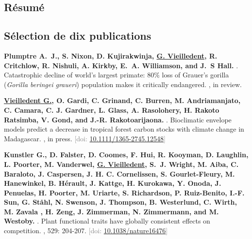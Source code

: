 \documentclass[10pt,a4paper,sans]{moderncv}
\newcounter{enumiv_gv}
\begin{document}
\vspace{0.3cm}
\subsection{Résumé}


\vspace{0.3cm}
\subsection{Sélection de dix publications}

\begin{thebibliography}{10}

\setcounter{enumiv}{9}
\textbf{Plumptre A.~J., S. Nixon, D. Kujirakwinja, \underline{G. Vieilledent}, R. Critchlow, R. Nishuli, A. Kirkby, E.~A. Williamson, and J.~S Hall.} 
.
\newblock Catastrophic decline of world’s largest primate: 80\% loss of Grauer’s gorilla (\emph{Gorilla beringei graueri}) population makes it critically endangered.
, in review.

\setcounter{enumiv}{8}
\textbf{\underline{Vieilledent G.}, O. Gardi, C. Grinand, C. Burren, M. Andriamanjato, C. Camara, C. J. Gardner, L. Glass, A. Rasolohery, H. Rakoto Ratsimba, V. Gond, and J.-R. Rakotoarijaona.} 
.
\newblock Bioclimatic envelope models predict a decrease in tropical forest carbon stocks with climate change in Madagascar.
, in press.
\newblock \textcolor{gray}{[doi: \href{http://dx.doi.org/10.1111/1365-2745.12548}{10.1111/1365-2745.12548}]}

\setcounter{enumiv}{7}
\textbf{Kunstler G., D. Falster, D. Coomes, F. Hui, R. Kooyman, D. Laughlin, L. Poorter, M. Vanderwel, \underline{G. Vieilledent}, S.~J. Wright, M. Aiba, C. Baraloto, J. Caspersen, J. H. C. Cornelissen, S. Gourlet-Fleury, M. Hanewinkel, B. Hérault, J. Kattge, H. Kurokawa, Y. Onoda, J. Penuelas, H. Poorter, M. Uriarte, S. Richardson, P. Ruiz-Benito, I.-F. Sun, G. Ståhl, N. Swenson, J. Thompson, B. Westerlund, C. Wirth, M. Zavala , H. Zeng, J. Zimmerman, N. Zimmermann, and M. Westoby.} 
.
\newblock Plant functional traits have globally consistent effects on competition.
, 529: 204-207.
\newblock \textcolor{gray}{[doi: \href{http://dx.doi.org/10.1038/nature16476}{10.1038/nature16476}]}


\end{thebibliography}
\end{document}
